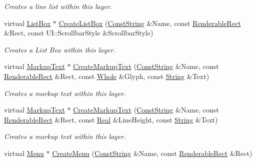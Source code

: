 \begin{DoxyCompactItemize}
\begin{DoxyCompactList}\small\item\em Creates a line list within this layer. \item\end{DoxyCompactList}\item 
virtual \hyperlink{classphys_1_1UI_1_1ListBox}{ListBox} $\ast$ \hyperlink{classphys_1_1UI_1_1Layer_a5cdc95615455382a1b55d9e2b5ae6d09}{CreateListBox} (\hyperlink{namespacephys_a5ce5049f8b4bf88d6413c47b504ebb31}{ConstString} \&Name, const \hyperlink{structphys_1_1UI_1_1RenderableRect}{RenderableRect} \&Rect, const UI::ScrollbarStyle \&ScrollbarStyle)
\begin{DoxyCompactList}\small\item\em Creates a List Box within this layer. \item\end{DoxyCompactList}\item 
virtual \hyperlink{classphys_1_1UI_1_1MarkupText}{MarkupText} $\ast$ \hyperlink{classphys_1_1UI_1_1Layer_a62338ca48dce418a53c4d9d027152a4c}{CreateMarkupText} (\hyperlink{namespacephys_a5ce5049f8b4bf88d6413c47b504ebb31}{ConstString} \&Name, const \hyperlink{structphys_1_1UI_1_1RenderableRect}{RenderableRect} \&Rect, const \hyperlink{namespacephys_a460f6bc24c8dd347b05e0366ae34f34a}{Whole} \&Glyph, const \hyperlink{namespacephys_aa03900411993de7fbfec4789bc1d392e}{String} \&Text)
\begin{DoxyCompactList}\small\item\em Creates a markup text within this layer. \item\end{DoxyCompactList}\item 
virtual \hyperlink{classphys_1_1UI_1_1MarkupText}{MarkupText} $\ast$ \hyperlink{classphys_1_1UI_1_1Layer_a556d60552d49483bda837b27fcb0f985}{CreateMarkupText} (\hyperlink{namespacephys_a5ce5049f8b4bf88d6413c47b504ebb31}{ConstString} \&Name, const \hyperlink{structphys_1_1UI_1_1RenderableRect}{RenderableRect} \&Rect, const \hyperlink{namespacephys_af7eb897198d265b8e868f45240230d5f}{Real} \&LineHeight, const \hyperlink{namespacephys_aa03900411993de7fbfec4789bc1d392e}{String} \&Text)
\begin{DoxyCompactList}\small\item\em Creates a markup text within this layer. \item\end{DoxyCompactList}\item 
virtual \hyperlink{classphys_1_1UI_1_1Menu}{Menu} $\ast$ \hyperlink{classphys_1_1UI_1_1Layer_afe5b5ed6409890ba6d9511e3246e69a9}{CreateMenu} (\hyperlink{namespacephys_a5ce5049f8b4bf88d6413c47b504ebb31}{ConstString} \&Name, const \hyperlink{structphys_1_1UI_1_1RenderableRect}{RenderableRect} \&Rect)

\end{DoxyCompactItemize}
